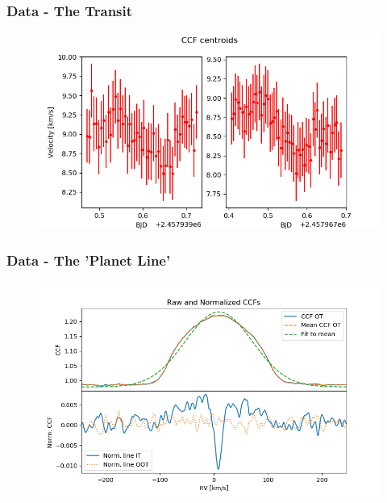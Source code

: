\documentclass[show notes]{beamer}
\begin{document}
\begin{frame}
\frametitle{Data - The Transit}
\begin{figure}
	\centering
	\includegraphics[width=\textwidth]{../figures/ccf_centroids.png}
	\label{fig:CCF_cent}
\end{figure}
\end{frame}

\begin{frame}
\frametitle{Data - The 'Planet Line'}
\begin{figure}
	\centering
	\includegraphics[width=\textwidth]{../figures/ccfs_norm.png}
	\label{fig:CCFs_norm}
\end{figure}
\end{frame}
\end{document}
